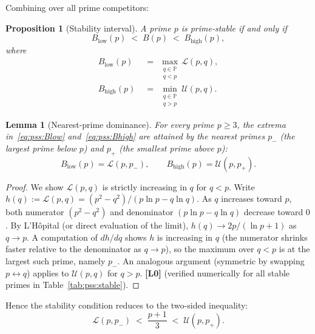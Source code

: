 \documentclass[12pt,a4paper]{article}
\newtheorem{lemma}[theorem]{Lemma}
\newtheorem{proposition}[theorem]{Proposition}
\theoremstyle{definition}
\theoremstyle{remark}
\newcommand{\PP}{\mathbb{P}}
\newcommand{\Lzero}{\textbf{[L0]}}
\begin{document}
Combining over all prime competitors:

\begin{proposition}[Stability interval]
\label{prop:pss:interval}
A prime $p$ is prime-stable if and only if
\begin{equation}
  B_{\mathrm{low}}(p) \;<\; B(p) \;<\; B_{\mathrm{high}}(p),
  \label{eq:pss:interval}
\end{equation}
where
\begin{align}
  B_{\mathrm{low}}(p) &\;=\; \max_{\substack{q \in \PP \\ q < p}} \mathcal{L}(p,q),
  \label{eq:pss:Blow}\\
  B_{\mathrm{high}}(p) &\;=\; \min_{\substack{q \in \PP \\ q > p}} \mathcal{U}(p,q).
  \label{eq:pss:Bhigh}
\end{align}
\end{proposition}

\begin{lemma}[Nearest-prime dominance]
\label{lem:pss:nearest}
For every prime $p \geq 3$, the extrema in~\eqref{eq:pss:Blow}
and~\eqref{eq:pss:Bhigh} are attained by the nearest primes $p_-$ (the
largest prime below $p$) and $p_+$ (the smallest prime above $p$):
\[
  B_{\mathrm{low}}(p) = \mathcal{L}(p,p_-), \qquad
  B_{\mathrm{high}}(p) = \mathcal{U}(p,p_+).
\]
\end{lemma}

\begin{proof}
We show $\mathcal{L}(p,q)$ is strictly increasing in $q$ for $q < p$.
Write $h(q) := \mathcal{L}(p,q) = (p^2-q^2)/(p\ln p - q\ln q)$.
As $q$ increases toward $p$, both numerator $(p^2-q^2)$ and denominator
$(p\ln p - q\ln q)$ decrease toward $0$.  By L'Hôpital (or direct evaluation of
the limit), $h(q)\to 2p/(\ln p+1)$ as $q\to p$.  A computation of $dh/dq$
shows $h$ is increasing in $q$ (the numerator shrinks faster relative to the
denominator as $q\to p$), so the maximum over $q < p$ is at the largest such
prime, namely $p_-$.  An analogous argument (symmetric by swapping $p\leftrightarrow q$)
applies to $\mathcal{U}(p,q)$ for $q > p$. \Lzero{} (verified numerically
for all stable primes in Table~\ref{tab:pss:stable}).
\end{proof}

Hence the stability condition reduces to the two-sided inequality:
\begin{equation}
  \mathcal{L}(p,p_-) \;<\; \frac{p+1}{3} \;<\; \mathcal{U}(p,p_+).
  \tag{S2}
  \label{eq:pss:S2}
\end{equation}
\end{document}
